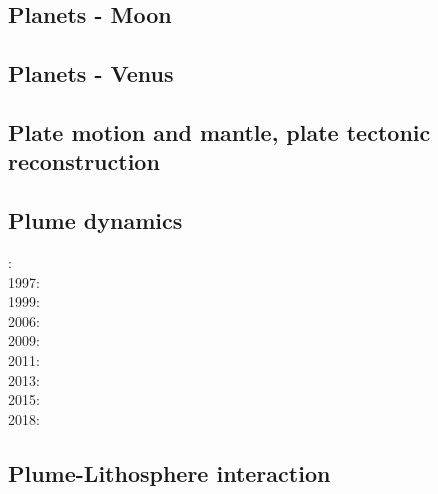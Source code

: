\cite{scbg90}
\cite{nist01}
\cite{vavv05}
\cite{seki14}
\cite{zhon16}

\subsection*{Planets - Moon}

\cite{zhdv19}

\subsection*{Planets - Venus}

\cite{scbg90}
\cite{kiha92}
\cite{somo96}
\cite{mazk98}\cite{moso98}
\cite{vavv05}
\cite{arta12}
\cite{cram17}\cite{dast17}
\cite{king18}



\subsection*{Plate motion and mantle, plate tectonic reconstruction}

\noindent
\cite{zieg92a}
\cite{zhgm98}
\cite{evan03}
\cite{lizh09}\cite{vasv09}
\cite{huss12}\cite{gutz12}
\cite{mosq13}
\cite{yoha15}
\cite{tewg19}

\subsection*{Plume dynamics}

: \cite{nasf94}\cite{hayu94}\\
1997: \cite{vank97}\\
1999: \cite{lays99}\\
2006: \cite{isst06}\\
2009: \cite{vavl09}\\
2011: \cite{toyu11}\cite{talz11}\cite{burk11}\cite{memm11}\\
2013: \cite{dagm13}\cite{madd13}\\
2015: \cite{daso15}\cite{hafg15}\\
2018: \cite{dacc18}

\subsection*{Plume-Lithosphere interaction}

